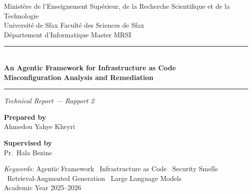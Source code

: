\documentclass[12pt, a4paper]{report}
\begin{document}

\begin{titlepage}
  \centering

  \vspace*{2.5cm}
  {\small Ministère de l'Enseignement Supérieur, de la Recherche Scientifique
   et de la Technologie}\\[4pt]
  {\small Université de Sfax \enspace\textbar\enspace Faculté des Sciences de Sfax}\\[4pt]
  {\small Département d'Informatique \enspace\textbar\enspace Master MRSI}

  \vspace{2.5cm}

  \noindent\rule{\linewidth}{0.6pt}\\[0.8cm]

  {\Large\bfseries\color{agentblue}
    An Agentic Framework for Infrastructure as Code\\[6pt]
    Misconfiguration Analysis and Remediation
  }\\[0.8cm]

  \noindent\rule{\linewidth}{0.6pt}

  \vspace{0.6cm}
  {\normalsize\itshape Technical Report --- Rapport 2}

  \vspace{3cm}
  \begin{minipage}[t]{0.45\textwidth}
    \raggedright
    {\small\bfseries Prepared by}\\[4pt]
    {\normalsize Ahmedou Yahye Kheyri}\\[2pt]

  \end{minipage}
  \hfill
  \begin{minipage}[t]{0.45\textwidth}
    \raggedleft
    {\small\bfseries Supervised by}\\[4pt]
    {\normalsize Pr.\ Hala Bezine}\\[2pt]

  \end{minipage}

  \vfill
  {\small\textit{Keywords:}\enspace
   Agentic Framework \textbullet\
   Infrastructure as Code \textbullet\
   Security Smells \textbullet\
   Retrieval-Augmented Generation \textbullet\
   Large Language Models}\\[1.2cm]

  {\small Academic Year 2025--2026}
  \vspace{1cm}

\end{titlepage}
\end{document}

